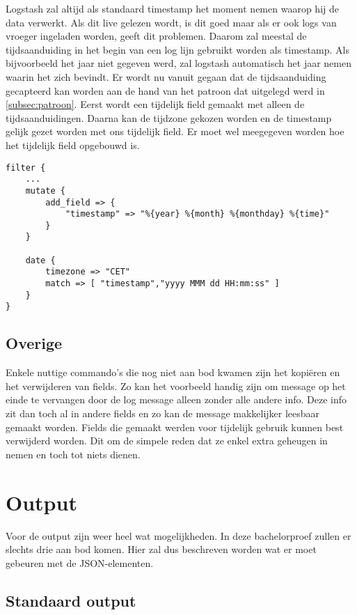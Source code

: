 Logstash zal altijd als standaard timestamp het moment nemen waarop hij de data verwerkt. Als dit live gelezen wordt, is dit goed maar als er ook logs van vroeger ingeladen worden, geeft dit problemen.  Daarom zal meestal de tijdsaanduiding in het begin van een log lijn gebruikt worden als timestamp. Als bijvoorbeeld het jaar niet gegeven werd, zal logstash automatisch het jaar nemen waarin het zich bevindt. Er wordt nu vanuit gegaan dat de tijdsaanduiding gecapteerd kan worden aan de hand van het patroon dat uitgelegd werd in \ref{subsec:patroon}. Eerst wordt een tijdelijk field gemaakt met alleen de tijdsaanduidingen. Daarna kan de tijdzone gekozen worden en de timestamp gelijk gezet worden met ons tijdelijk field. Er moet wel meegegeven worden hoe het tijdelijk field opgebouwd is. 

\lstset{escapechar=@,style=customc}  
\begin{lstlisting}[frame=single]  
filter {
	...
	mutate {
		add_field => {
			"timestamp" => "%{year} %{month} %{monthday} %{time}"
		}
	}

	date {
		timezone => "CET"
		match => [ "timestamp","yyyy MMM dd HH:mm:ss" ]  
	}
}
\end{lstlisting}

\subsection{Overige}
\label{subsec:overige}

Enkele nuttige commando’s die nog niet aan bod kwamen zijn het kopiëren en het verwijderen van fields. Zo kan het voorbeeld handig zijn om message op het einde te vervangen door de log message alleen zonder alle andere info. Deze info zit dan toch al in andere fields en zo kan de message makkelijker leesbaar gemaakt worden. Fields die gemaakt werden voor tijdelijk gebruik kunnen best verwijderd worden. Dit om de simpele reden dat ze enkel extra geheugen in nemen en toch tot niets dienen.

\section{Output}
Voor de output zijn weer heel wat mogelijkheden. In deze bachelorproef zullen er slechts drie aan bod komen. Hier zal dus beschreven worden wat er moet gebeuren met de JSON-elementen.

\subsection{Standaard output}
\label{subsec:standaardoutput}

